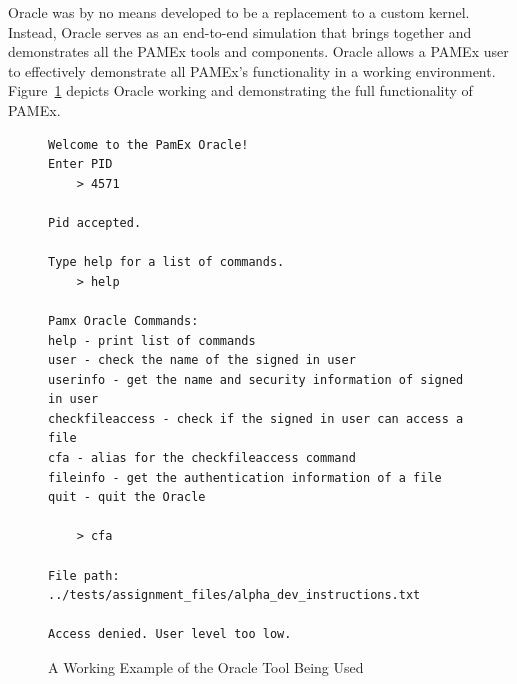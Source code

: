 Oracle was by no means developed to be a replacement to a custom 
kernel. Instead, Oracle serves as an end-to-end simulation that brings 
together and demonstrates all the PAMEx tools and components. Oracle 
allows a PAMEx user to effectively demonstrate all PAMEx’s functionality 
in a working environment. Figure~\ref{oracle} depicts Oracle working
and demonstrating the full functionality of PAMEx.
\clearpage

\begin{figure}[htb]
    \centering
    \begin{tcolorbox}[width=\textwidth, boxsep=5pt, sharp corners, colback=white, colframe=black, fontupper=\footnotesize\ttfamily] %
        \begin{minipage}{\textwidth} %
            \begin{lstlisting}
Welcome to the PamEx Oracle!
Enter PID
    > 4571

Pid accepted.

Type help for a list of commands.
    > help

Pamx Oracle Commands:
help - print list of commands
user - check the name of the signed in user
userinfo - get the name and security information of signed in user
checkfileaccess - check if the signed in user can access a file
cfa - alias for the checkfileaccess command
fileinfo - get the authentication information of a file
quit - quit the Oracle

    > cfa

File path: ../tests/assignment_files/alpha_dev_instructions.txt

Access denied. User level too low.
            \end{lstlisting}
        \end{minipage}
    \end{tcolorbox}
    \caption[Oracle Tool Demonstration]{\label{oracle}A Working Example of the Oracle Tool Being Used}
\end{figure}

\vspace{\baselineskip}

